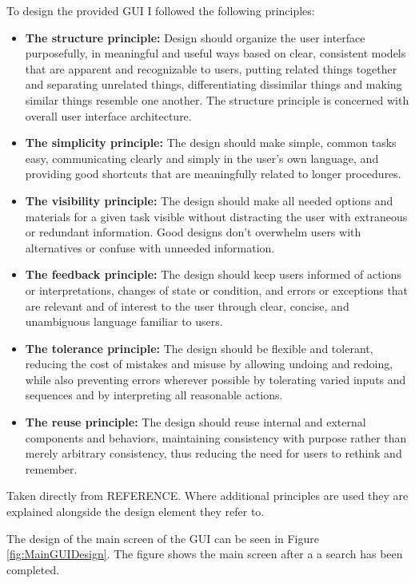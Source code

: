 To design the provided GUI I followed the following principles:
\begin{itemize}
 \item \textbf{The structure principle:} Design should organize the user interface purposefully, in meaningful and useful ways based on clear, consistent models that are apparent and recognizable to users, putting related things together and separating unrelated things, differentiating dissimilar things and making similar things resemble one another. 
The structure principle is concerned with overall user interface architecture.
\item \textbf{The simplicity principle:} The design should make simple, common tasks easy, communicating clearly and simply in the user's own language, and providing good shortcuts that are meaningfully related to longer procedures.
\item \textbf{The visibility principle:} The design should make all needed options and materials for a given task visible without distracting the user with extraneous or redundant information. 
Good designs don't overwhelm users with alternatives or confuse with unneeded information.
\item \textbf{The feedback principle:} The design should keep users informed of actions or interpretations, changes of state or condition, and errors or exceptions that are relevant and of interest to the user through clear, concise, and unambiguous language familiar to users.
\item \textbf{The tolerance principle:} The design should be flexible and tolerant, reducing the cost of mistakes and misuse by allowing undoing and redoing, while also preventing errors wherever possible by tolerating varied inputs and sequences and by interpreting all reasonable actions.
\item \textbf{The reuse principle:} The design should reuse internal and external components and behaviors, maintaining consistency with purpose rather than merely arbitrary consistency, thus reducing the need for users to rethink and remember.
\end{itemize}
Taken directly from REFERENCE.
Where additional principles are used they are explained alongside the design element they refer to.

The design of the main screen of the GUI can be seen in Figure \ref{fig:MainGUIDesign}.
The figure shows the main screen after a a search has been completed.

